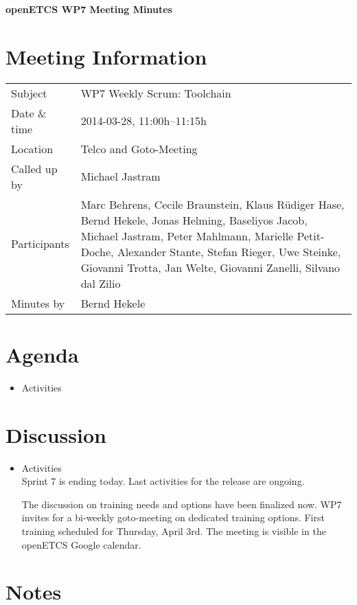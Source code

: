 \documentclass[a4paper, 11pt]{article}
\begin{document}
{\begin{center}\huge\bf openETCS WP7 Meeting Minutes\end{center}}
\section{Meeting Information}

\renewcommand{\arraystretch}{1.5}
\begin{supertabular}{m{.2\textwidth}m{.8\textwidth}}
Subject & WP7 Weekly Scrum: Toolchain\\
Date \& time & 2014-03-28, 11:00h--11:15h\\
Location & Telco and Goto-Meeting\\
Called up by & Michael Jastram\\
Participants &
Marc Behrens,
Cecile Braunstein,
Klaus R\"udiger Hase,
Bernd Hekele,
Jonas Helming,
Baseliyos Jacob,
Michael Jastram,
Peter Mahlmann,
Marielle Petit-Doche,
Alexander Stante,
Stefan Rieger,
Uwe Steinke,
Giovanni Trotta,
Jan Welte,
Giovanni Zanelli,
Silvano dal Zilio
\\

Minutes by & Bernd Hekele\\

\end{supertabular}
\renewcommand{\arraystretch}{1.0}


\section{Agenda}
\begin{itemize}
\item Activities
\end{itemize}

\section{Discussion}

\begin{itemize}
\item Activities\\
Sprint 7 is ending today. Last activities for the release are ongoing.

The discussion on training needs and options have been finalized now. WP7 invites for a bi-weekly goto-meeting on dedicated training options. First training scheduled for Thursday, April 3rd. The meeting is visible in the openETCS Google calendar.

\end{itemize}

\section{Notes}
\end{document}
